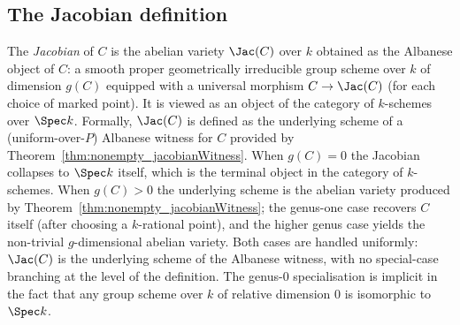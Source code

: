 \subsection{The Jacobian definition}
\begin{definition}\leanok
[Jacobian]
  \label{def:Jacobian}
  
  The \emph{Jacobian} of \(C\) is the abelian variety \(\Jac(C)\) over \(k\) obtained as the Albanese object of \(C\): a smooth proper geometrically irreducible group scheme over \(k\) of dimension \(g(C)\) equipped with a universal morphism \(C \to \Jac(C)\) (for each choice of marked point). It is viewed as an object of the category of \(k\)-schemes over \(\Spec k\). Formally, \(\Jac(C)\) is defined as the underlying scheme of a (uniform-over-\(P\)) Albanese witness for \(C\) provided by Theorem~\ref{thm:nonempty_jacobianWitness}.
  When \(g(C) = 0\) the Jacobian collapses to \(\Spec k\) itself, which is the terminal object in the category of \(k\)-schemes. When \(g(C) > 0\) the underlying scheme is the abelian variety produced by Theorem~\ref{thm:nonempty_jacobianWitness}; the genus-one case recovers \(C\) itself (after choosing a \(k\)-rational point), and the higher genus case yields the non-trivial \(g\)-dimensional abelian variety. Both cases are handled uniformly: \(\Jac(C)\) is the underlying scheme of the Albanese witness, with no special-case branching at the level of the definition. The genus-\(0\) specialisation is implicit in the fact that any group scheme over \(k\) of relative dimension \(0\) is isomorphic to \(\Spec k\).
\end{definition}
